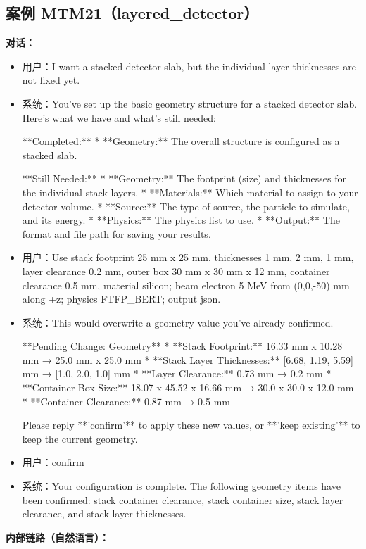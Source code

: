 \documentclass[11pt]{ctexart}
\begin{document}
\subsection{案例 MTM21（layered\_detector）}
\textbf{对话：}
\begin{itemize}
\item 用户：I want a stacked detector slab, but the individual layer thicknesses are not fixed yet.
\item 系统：You've set up the basic geometry structure for a stacked detector slab. Here's what we have and what's still needed:

**Completed:**
*   **Geometry:** The overall structure is configured as a stacked slab.

**Still Needed:**
*   **Geometry:** The footprint (size) and thicknesses for the individual stack layers.
*   **Materials:** Which material to assign to your detector volume.
*   **Source:** The type of source, the particle to simulate, and its energy.
*   **Physics:** The physics list to use.
*   **Output:** The format and file path for saving your results.
\item 用户：Use stack footprint 25 mm x 25 mm, thicknesses 1 mm, 2 mm, 1 mm, layer clearance 0.2 mm, outer box 30 mm x 30 mm x 12 mm, container clearance 0.5 mm, material silicon; beam electron 5 MeV from (0,0,-50) mm along +z; physics FTFP\_BERT; output json.
\item 系统：This would overwrite a geometry value you've already confirmed.

**Pending Change: Geometry**
*   **Stack Footprint:** 16.33 mm x 10.28 mm → 25.0 mm x 25.0 mm
*   **Stack Layer Thicknesses:** [6.68, 1.19, 5.59] mm → [1.0, 2.0, 1.0] mm
*   **Layer Clearance:** 0.73 mm → 0.2 mm
*   **Container Box Size:** 18.07 x 45.52 x 16.66 mm → 30.0 x 30.0 x 12.0 mm
*   **Container Clearance:** 0.87 mm → 0.5 mm

Please reply **'confirm'** to apply these new values, or **'keep existing'** to keep the current geometry.
\item 用户：confirm
\item 系统：Your configuration is complete. The following geometry items have been confirmed: stack container clearance, stack container size, stack layer clearance, and stack layer thicknesses.
\end{itemize}
\textbf{内部链路（自然语言）：}
\end{document}
